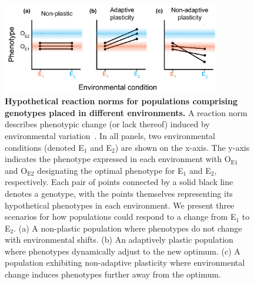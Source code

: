 \documentclass[utf8]{frontiersSCNS} %
\begin{document}
\begin{raggedbottom}
\begin{figure}[ht!]
\centering
\includegraphics[width=0.85\textwidth]{media-reaction-norms.pdf}
\caption{\small
\textbf{Hypothetical reaction norms for populations comprising genotypes placed in different environments.}
A reaction norm describes phenotypic change (or lack thereof) induced by environmental variation~\citep{west-eberhard_phenotypic_2008}. 
In all panels, two environmental conditions (denoted E$_1$ and E$_2$) are shown on the x-axis.
The y-axis indicates the phenotype expressed in each environment with O$_{\text{E}1}$ and O$_{\text{E}2}$ designating the optimal phenotype for E$_1$ and E$_2$, respectively.
Each pair of points connected by a solid black line denotes a genotype, with the points themselves representing its hypothetical phenotypes in each environment.
We present three scenarios for how populations could respond to a change from E$_1$ to E$_2$.
(a) A non-plastic population where phenotypes do not change with environmental shifts.  
(b) An adaptively plastic population where phenotypes dynamically adjust to the new optimum. 
(c) A population exhibiting non-adaptive plasticity where environmental change induces phenotypes further away from the optimum. 
}
\label{fig:reaction-norms}
\end{figure}


\end{raggedbottom}
\end{document}
